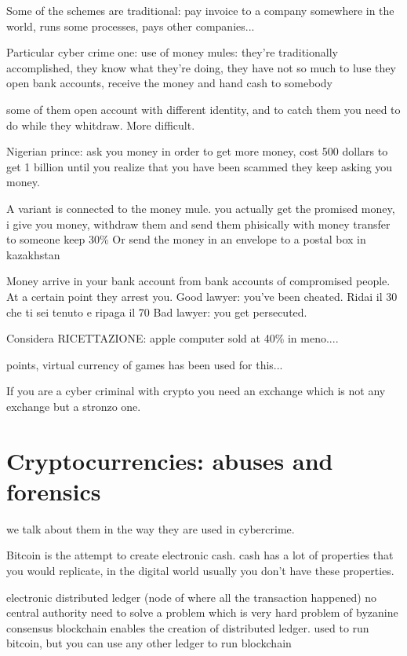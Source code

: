     Some of the schemes are traditional:
        pay invoice to a company somewhere in the world, runs some processes, pays other companies... 

    Particular cyber crime one:
        use of money mules: they're traditionally accomplished, they know what they're doing, they have not so much to luse
        they open bank accounts, receive the money and hand cash to somebody
        
        some of them open account with different identity, and to catch them you need to do while they whitdraw. More difficult.

        Nigerian prince:
            ask you money in order to get more money, cost 500 dollars to get 1 billion
            until you realize that you have been scammed they keep asking you money.

            A variant is connected to the money mule.
                you actually get the promised money, i give you money, withdraw them and send them phisically with money transfer to someone
                keep 30\%
                Or send the money in an envelope to a postal box in kazakhstan

                Money arrive in your bank account from bank accounts of compromised people.
                At a certain point they arrest you.
                Good lawyer: you've been cheated. Ridai il 30 che ti sei tenuto e ripaga il 70
                Bad lawyer: you get persecuted.

        Considera RICETTAZIONE: apple computer sold at 40\% in meno....

        points, virtual currency of games has been used for this...  

        If you are a cyber criminal with crypto you need an exchange which is not any exchange but a stronzo one.


\chapter{Cryptocurrencies: abuses and forensics}
    we talk about them in the way they are used in cybercrime.

    Bitcoin is the attempt to create electronic cash.
    cash has a lot of properties that you would replicate, in the digital world usually you don't have these properties.

    electronic distributed ledger (node of where all the transaction happened)
        no central authority
        need to solve a problem which is very hard
        problem of byzanine consensus
        blockchain enables the creation of distributed ledger.
        used to run bitcoin, but you can use any other ledger to run blockchain

